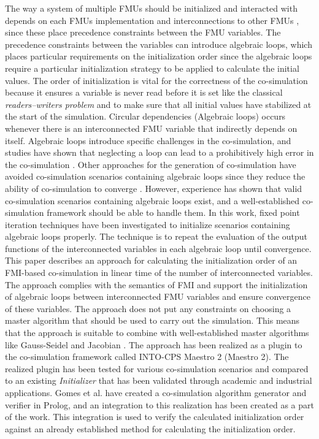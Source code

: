 The way a system of multiple FMUs should be initialized and interacted with depends on each FMUs implementation and interconnections to other FMUs \cite{gomes_lucio_vangheluwe_2019}, since these place precedence constraints between the FMU variables. The precedence constraints between the variables can introduce algebraic loops, which places particular requirements on the initialization order since the algebraic loops require a particular initialization strategy to be applied to calculate the initial values. The order of initialization is vital for the correctness of the co-simulation \cite{Thule2018} because it ensures a variable is never read before it is set like the classical \textit{readers–writers problem} and to make sure that all initial values have stabilized at the start of the simulation. Circular dependencies (Algebraic loops) occurs whenever there is an interconnected FMU variable that indirectly depends on itself. Algebraic loops introduce specific challenges in the co-simulation, and studies have shown that neglecting a loop can lead to a prohibitively high error in the co-simulation \cite{Kubler2000}. Other approaches for the generation of co-simulation have avoided co-simulation scenarios containing algebraic loops since they reduce the ability of co-simulation to converge \cite{Amalio2016CheckingCo-simulation, BromanCompositionCo-Simulation}. However, experience has shown that valid co-simulation scenarios containing algebraic loops exist, and a well-established co-simulation framework should be able to handle them. In this work, fixed point iteration techniques have been investigated to initialize scenarios containing algebraic loops properly. The technique is to repeat the evaluation of the output functions of the interconnected variables in each algebraic loop until convergence\cite{Gomes2018}.\\

This paper describes an approach for calculating the initialization order of an FMI-based co-simulation in linear time of the number of interconnected variables. The approach complies with the semantics of FMI and support the initialization of algebraic loops between interconnected FMU variables and ensure convergence of these variables. The approach does not put any constraints on choosing a master algorithm that should be used to carry out the simulation. This means that the approach is suitable to combine with well-established master algorithms like Gauss-Seidel and Jacobian \cite{Palensky2017}. The approach has been realized as a plugin to the co-simulation framework called INTO-CPS Maestro 2 (Maestro 2). The realized plugin has been tested for various co-simulation scenarios and compared to an existing \textit{Initializer} that has been validated through academic and industrial applications. Gomes et al. have created a co-simulation algorithm generator and verifier\cite{gomes_lucio_vangheluwe_2019} in Prolog, and an integration to this realization has been created as a part of the work. This integration is used to verify the calculated initialization order against an already established method for calculating the initialization order.\\

